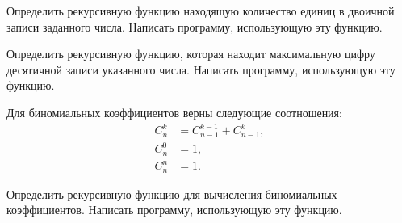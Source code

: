 \task Определить рекурсивную функцию находящую количество единиц в
двоичной записи заданного числа. Написать программу, использующую эту
функцию.

\task Определить рекурсивную функцию, которая находит максимальную
цифру десятичной записи указанного числа. Написать программу,
использующую эту функцию.

\task Для биномиальных коэффициентов верны следующие соотношения:
\begin{align*}
  C_n^k &= C_{n-1}^{k-1} + C_{n-1}^k,\\
  C_n^0 &= 1,\\
  C_n^n &= 1.
\end{align*}

Определить рекурсивную функцию для вычисления биномиальных
коэффициентов. Написать программу, использующую эту функцию.
